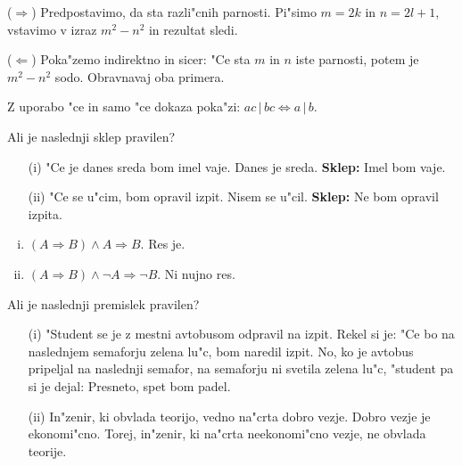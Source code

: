 \documentclass[11pt,paper=b5,footinclude,headinclude]{scrbook} %
\newtheorem{ex}{Vaja\hypertarget{sol:\theex}}[chapter]
\begin{document}
\begin{ex}
\begin{sol}
 ($\Rightarrow$) Predpostavimo, da sta razli"cnih parnosti. Pi"simo  $m=2k$ in $n=2l+1$, vstavimo v izraz $m^2- n^2$ in rezultat sledi.

($\Leftarrow$) Poka"zemo indirektno in sicer: "Ce sta $m$ in $n$ iste parnosti, potem je $m^2- n^2$ sodo. Obravnavaj oba primera.
\end{sol}


\end{ex} \begin{ex} Z uporabo "ce in samo "ce dokaza poka"zi: $ac\,|\,bc \Leftrightarrow a\,|\,b$.

\end{ex} \begin{ex} Ali je naslednji sklep pravilen?
\begin{enumerate}
\item[(i)] "Ce je danes sreda bom imel vaje. Danes je sreda. \textbf{Sklep:} Imel bom vaje.


\item[(ii)] "Ce se u"cim, bom opravil izpit. Nisem se u"cil.\textbf{ Sklep:} Ne bom opravil izpita.

\end{enumerate}
\begin{sol}
    \begin{enumerate}[(i)]
        \item $(A\Rightarrow B) \wedge A \Rightarrow B$. Res je.
        \item $(A\Rightarrow B) \wedge \neg A \Rightarrow \neg B$. Ni nujno res.
    \end{enumerate}
\end{sol}

\end{ex} \begin{ex} Ali je naslednji premislek pravilen?
\begin{enumerate}
\item[(i)] "Student se je z mestni avtobusom odpravil na izpit. Rekel si je: "Ce bo na naslednjem semaforju zelena lu"c, bom naredil izpit. No, ko je avtobus pripeljal na naslednji semafor, na semaforju ni svetila zelena lu"c, "student pa si je dejal: Presneto, spet bom padel.


\item[(ii)] In"zenir, ki obvlada teorijo, vedno na"crta dobro vezje. Dobro vezje je ekonomi"cno. Torej, in"zenir, ki na"crta neekonomi"cno vezje, ne obvlada teorije. 

\end{enumerate}


\end{ex}
\end{document}
